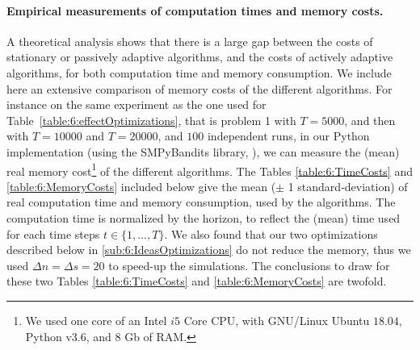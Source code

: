 

\paragraph{Empirical measurements of computation times and memory costs.}
%
A theoretical analysis shows that there is a large gap between the costs of stationary or passively adaptive algorithms,
and the costs of actively adaptive algorithms, for both computation time and memory consumption.
%
We include here an extensive comparison of memory costs of the different algorithms.
%
For instance on the same experiment as the one used for Table~\ref{table:6:effectOptimizations}, that is problem 1 with $T=5000$, and then with $T=10000$ and $T=20000$, and $100$ independent runs,
in our Python implementation (using the SMPyBandits library, \cite{SMPyBandits}), we can measure the (mean) real memory cost\footnote{We used one core of an Intel $i5$ Core CPU, with GNU/Linux Ubuntu $18.04$, Python v$3.6$, and $8$ Gb of RAM.} of the different algorithms.
The Tables \ref{table:6:TimeCosts} and \ref{table:6:MemoryCosts} included below give the mean ($\pm$ 1 standard-deviation) of real computation time and memory consumption, used by the algorithms.
The computation time is normalized by the horizon, to reflect the (mean) time used for each time steps $t\in\{1,\dots,T\}$.
%
We also found that our two optimizations described below in \ref{sub:6:IdeasOptimizations} do not reduce the memory, thus we used $\Delta n = \Delta s = 20$ to speed-up the simulations.
%
The conclusions to draw for these two Tables \ref{table:6:TimeCosts} and \ref{table:6:MemoryCosts} are twofold.


